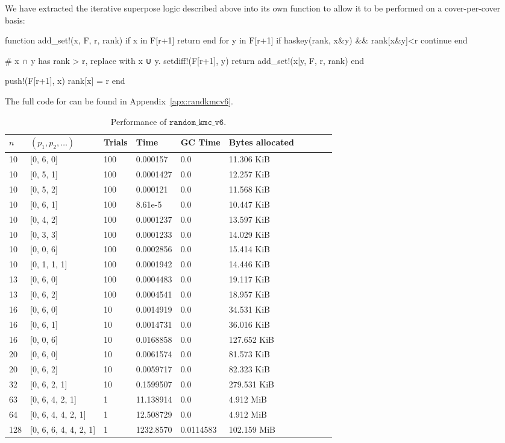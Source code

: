 We have extracted the iterative superpose logic described above into its own function to allow it to be performed on a cover-per-cover basis:

\begin{jllisting}
function add_set!(x, F, r, rank)
  if x in F[r+1] return end
  for y in F[r+1]
    if haskey(rank, x&y) && rank[x&y]<r
    continue
    end
    
    # x ∩ y has rank > r, replace with x ∪ y.
    setdiff!(F[r+1], y)
    return add_set!(x|y, F, r, rank)
  end
  
  push!(F[r+1], x)
  rank[x] = r
end
\end{jllisting}
The full code for  can be found in Appendix~\ref{apx:randkmcv6}.

\begin{table*}[ht!]
  \centering
  \caption{Performance of $\texttt{random\_kmc\_v6}$.}
  \label{tab:perf_v6}
  \begin{threeparttable}
    \begin{tabular}{llllllllll}
      \toprule
      $n$ & $(p_1, p_2, \ldots)$ & Trials & Time  & GC Time & Bytes allocated \\
      \midrule
      10 & [0, 6, 0] & 100 & 0.000157 & 0.0 & 11.306 KiB \\
      10 & [0, 5, 1] & 100 & 0.0001427 & 0.0 & 12.257 KiB \\
      10 & [0, 5, 2] & 100 & 0.000121 & 0.0 & 11.568 KiB \\
      10 & [0, 6, 1] & 100 & 8.61e-5 & 0.0 & 10.447 KiB \\
      10 & [0, 4, 2] & 100 & 0.0001237 & 0.0 & 13.597 KiB \\
      10 & [0, 3, 3] & 100 & 0.0001233 & 0.0 & 14.029 KiB \\
      10 & [0, 0, 6] & 100 & 0.0002856 & 0.0 & 15.414 KiB \\
      10 & [0, 1, 1, 1] & 100 & 0.0001942 & 0.0 & 14.446 KiB \\
      13 & [0, 6, 0] & 100 & 0.0004483 & 0.0 & 19.117 KiB \\
      13 & [0, 6, 2] & 100 & 0.0004541 & 0.0 & 18.957 KiB \\
      16 & [0, 6, 0] & 10 & 0.0014919 & 0.0 & 34.531 KiB \\
      16 & [0, 6, 1] & 10 & 0.0014731 & 0.0 & 36.016 KiB \\
      16 & [0, 0, 6] & 10 & 0.0168858 & 0.0 & 127.652 KiB \\
      20 & [0, 6, 0] & 10 & 0.0061574 & 0.0 & 81.573 KiB \\
      20 & [0, 6, 2] & 10 & 0.0059717 & 0.0 & 82.323 KiB \\
      32 & [0, 6, 2, 1] & 10 & 0.1599507 & 0.0 & 279.531 KiB \\
      63 & [0, 6, 4, 2, 1] & 1 & 11.138914 & 0.0 & 4.912 MiB \\
      64 & [0, 6, 4, 4, 2, 1] & 1 & 12.508729 & 0.0 & 4.912 MiB \\
      128 & [0, 6, 6, 4, 4, 2, 1] & 1 & 1232.8570 & 0.0114583 & 102.159 MiB \\
      \bottomrule
    \end{tabular}
  \end{threeparttable}
\end{table*}
